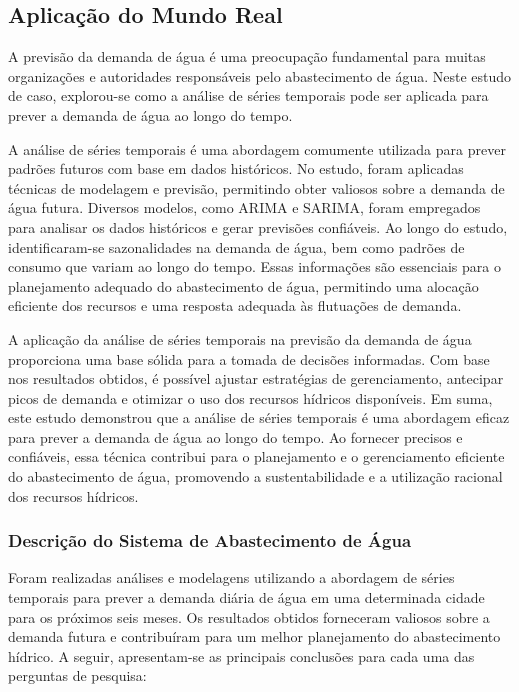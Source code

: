 \subsection{Aplica\c c\~ao do Mundo Real}\label{subsec:estudo-reslt}


A previsão da demanda de água é uma preocupação fundamental para muitas organizações e autoridades responsáveis pelo abastecimento de água. Neste estudo de caso, explorou-se como a análise de séries temporais pode ser aplicada para prever a demanda de água ao longo do tempo.

A análise de séries temporais é uma abordagem comumente utilizada para prever padrões futuros com base em dados históricos. No estudo, foram aplicadas técnicas de modelagem e previsão, permitindo obter valiosos sobre a demanda de água futura. Diversos modelos, como ARIMA e SARIMA, foram empregados para analisar os dados históricos e gerar previsões confiáveis.
Ao longo do estudo, identificaram-se sazonalidades na demanda de água, bem como padrões de consumo que variam ao longo do tempo. Essas informações são essenciais para o planejamento adequado do abastecimento de água, permitindo uma alocação eficiente dos recursos e uma resposta adequada às flutuações de demanda.

A aplicação da análise de séries temporais na previsão da demanda de água proporciona uma base sólida para a tomada de decisões informadas. Com base nos resultados obtidos, é possível ajustar estratégias de gerenciamento, antecipar picos de demanda e otimizar o uso dos recursos hídricos disponíveis.
Em suma, este estudo demonstrou que a análise de séries temporais é uma abordagem eficaz para prever a demanda de água ao longo do tempo. Ao fornecer precisos e confiáveis, essa técnica contribui para o planejamento e o gerenciamento eficiente do abastecimento de água, promovendo a sustentabilidade e a utilização racional dos recursos hídricos.



\subsubsection{Descri\c c\~ao do Sistema de Abastecimento de \'Agua}



Foram realizadas análises e modelagens utilizando a abordagem de séries temporais para prever a demanda diária de água em uma determinada cidade para os próximos seis meses. Os resultados obtidos forneceram valiosos sobre a demanda futura e contribuíram para um melhor planejamento do abastecimento hídrico. A seguir, apresentam-se as principais conclusões para cada uma das perguntas de pesquisa:

